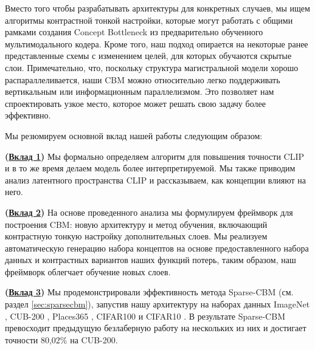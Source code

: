 Вместо того чтобы разрабатывать архитектуры для конкретных случаев, мы ищем алгоритмы контрастной тонкой настройки, которые могут работать с общими рамками создания Concept Bottleneck из предварительно обученного мультимодального кодера. Кроме того, наш подход опирается на некоторые ранее представленные схемы с изменением целей, для которых обучаются скрытые слои. Примечательно, что, поскольку структура магистральной модели хорошо распараллеливается, наши CBM можно относительно легко поддерживать вертикальным или информационным параллелизмом. Это позволяет нам спроектировать узкое место, которое может решать свою задачу более эффективно.

Мы резюмируем основной вклад нашей работы следующим образом:

\textbf{(\underline{Вклад 1})} Мы формально определяем алгоритм для повышения точности CLIP и в то же время делаем модель более интерпретируемой. Мы также приводим анализ латентного пространства CLIP и рассказываем, как концепции влияют на него. 

\textbf{(\underline{Вклад 2})} На основе проведенного анализа мы формулируем фреймворк для построения CBM: новую архитектуру и метод обучения, включающий контрастную тонкую настройку дополнительных слоев. Мы реализуем автоматическую генерацию набора концептов на основе предоставленного набора данных и контрастных вариантов наших функций потерь, таким образом, наш фреймворк облегчает обучение новых слоев.

\textbf{(\underline{Вклад 3})} Мы продемонстрировали эффективность метода Sparse-CBM (см. раздел \ref{sec:sparsecbm}), запустив нашу архитектуру на наборах данных ImageNet \cite{russakovsky2015imagenet}, CUB-200 \cite{wah_branson_welinder_perona_belongie_2011}, Places365 \cite{7968387}, CIFAR100 и CIFAR10 \cite{krizhevsky2009learning}. В результате Sparse-CBM превосходит предыдущую безлаберную \cite{oikarinen2023labelfree} работу на нескольких из них и достигает точности 80,02\% на CUB-200.

